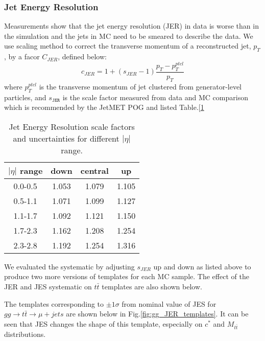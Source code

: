 \documentclass{cmspaperpdf}
\begin{document}
\subsubsection{Jet Energy Resolution}
Measurements show that the jet energy resolution (JER) in data is worse than in the simulation and the jets in MC need to be smeared to describe the data. We use scaling method to correct the transverse momentum of a reconstructed jet, $p_T$, by a facor $C_{JER}$, defined below:
\begin{equation}
c_{JER}=1+(s_{JER}-1)\frac{p_T-p_T ^{ptcl}}{p_T}
\end{equation}
where $p_T ^{ptcl}$ is the transverse momentum of jet clustered from generator-level particles, and $s_{\texttt{JER}}$ is the scale factor measured from data and MC comparison which is recommended by the JetMET POG and listed Table.[\ref{tab:JER_SF}

\begin{table}[htb]
\centering
\begin{tabular}{|cccc|}
\hline
$|\eta|$ range	 & down 		& central 	 &  up              \\ \hline
0.0-0.5     		 &  1.053       & 1.079   & 1.105             \\
0.5-1.1 	         &  1.071       & 1.099   & 1.127             \\ 
1.1-1.7          &  1.092       & 1.121   & 1.150              \\ 
1.7-2.3          &  1.162        & 1.208  & 1.254             \\
2.3-2.8          &  1.192       & 1.254   & 1.316              \\  \hline 
\end{tabular}
\caption{ Jet Energy Resolution scale factors and uncertainties for different $|\eta|$ range. }
\label{tab:JER_SF}
\end{table}

We evaluated the systematic by adjusting $s_{JER}$ up and down as listed above to produce two more versions of templates for each MC sample. The effect of the JER and JES systematic on $t\bar{t}$ templates are also shown below.

The templates corresponding to $\pm 1\sigma$ from nominal value of JES for $gg\rightarrow t\bar{t}\rightarrow \mu+jets$ are shown below in Fig.\ref{fig:gg_JER_templates}. It can be seen that JES changes the shape of this template, especially on $c^*$ and $M_{t\bar{t}}$ distributions.
\end{document}
